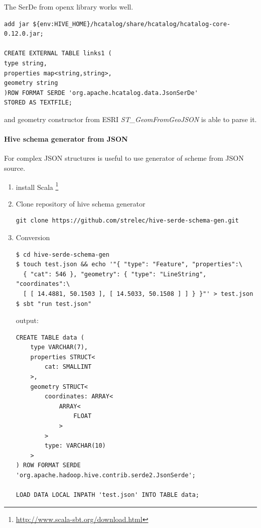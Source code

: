 \documentclass[a4paper,12pt,oneside]{report}
\begin{document}
The SerDe from openx library works well.
\begin{footnotesize}
			\begin{lstlisting}[style=python]
add jar ${env:HIVE_HOME}/hcatalog/share/hcatalog/hcatalog-core-0.12.0.jar;

CREATE EXTERNAL TABLE links1 (
type string,
properties map<string,string>,
geometry string
)ROW FORMAT SERDE 'org.apache.hcatalog.data.JsonSerDe'
STORED AS TEXTFILE;
			\end{lstlisting}
\end{footnotesize}
and geometry constructor from ESRI \textit{ST\_GeomFromGeoJSON} is able to parse it.


\paragraph{Hive schema generator from JSON}
For complex JSON structures is useful to use generator of scheme from JSON
source.
\begin{enumerate}
\item install Scala \footnote{\url{http://www.scala-sbt.org/download.html}}
\item Clone repository of hive schema generator
		\begin{footnotesize}
			\begin{lstlisting}[style=python]
git clone https://github.com/strelec/hive-serde-schema-gen.git
			\end{lstlisting}
		\end{footnotesize}
\item  Conversion
		\begin{footnotesize}
			\begin{lstlisting}[style=python]
$ cd hive-serde-schema-gen
$ touch test.json && echo '"{ "type": "Feature", "properties":\
  { "cat": 546 }, "geometry": { "type": "LineString", "coordinates":\
  [ [ 14.4881, 50.1503 ], [ 14.5033, 50.1508 ] ] } }"' > test.json
$ sbt "run test.json"
			\end{lstlisting}
		\end{footnotesize}
		output:		
		\begin{footnotesize}
			\begin{lstlisting}[style=python]
CREATE TABLE data (
    type VARCHAR(7),
    properties STRUCT<
        cat: SMALLINT
    >,
    geometry STRUCT<
        coordinates: ARRAY<
            ARRAY<
                FLOAT
            >
        >
        type: VARCHAR(10)
    >
) ROW FORMAT SERDE 'org.apache.hadoop.hive.contrib.serde2.JsonSerde';

LOAD DATA LOCAL INPATH 'test.json' INTO TABLE data;
			\end{lstlisting}
		\end{footnotesize}
		
\end{enumerate}
\end{document}
